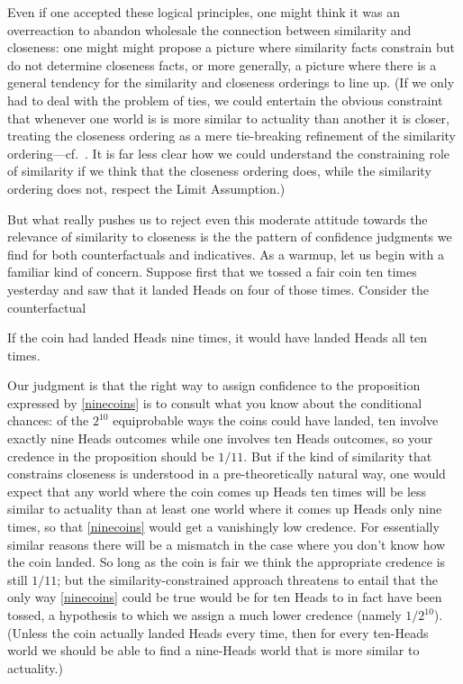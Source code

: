 \documentclass[If.tex]{subfiles}
\begin{document}
Even if one accepted these logical principles, one might think it was an overreaction to abandon wholesale the connection between similarity and closeness: one might might propose a picture where similarity facts constrain but do not determine closeness facts, or more generally, a picture where there is a general tendency for the similarity and closeness orderings to line up. (If we only had to deal with the problem of ties, we could entertain the obvious constraint that whenever one world is is more similar to actuality than another it is closer, treating the closeness ordering as a mere tie-breaking refinement of the similarity ordering---cf.~\cite{StalnakerDCEM}. It is far less clear how we could understand the constraining role of similarity if we think that the closeness ordering does, while the similarity ordering does not, respect the Limit Assumption.) 

But what really pushes us to reject even this moderate attitude towards the relevance of similarity to closeness is the the pattern of confidence judgments we find for both counterfactuals and indicatives. As a warmup, let us begin with a familiar kind of concern. Suppose first that we tossed a fair coin ten times yesterday and saw that it landed Heads on four of those times. Consider the counterfactual
\begin{prop}
\nitem \label{ninecoins}
  If the coin had landed Heads nine times, it would have landed Heads all ten times.
\end{prop}
Our judgment is that the right way to assign confidence to the proposition expressed by \ref{ninecoins} is to consult what you know about the conditional chances: of the $2^{10}$ equiprobable ways the coins could have landed, ten involve exactly nine Heads outcomes while one involves ten Heads outcomes, so your credence in the proposition should be $1/11$. But if the kind of similarity that constrains closeness is understood in a pre-theoretically natural way, one would expect that any world where the coin comes up Heads ten times will be less similar to actuality than at least one world where it comes up Heads only nine times, so that \ref{ninecoins} would get a vanishingly low credence. For essentially similar reasons there will be a mismatch in the case where you don't know how the coin landed. So long as the coin is fair we think the appropriate credence is still $1/11$; but the similarity-constrained approach threatens to entail that the only way \ref{ninecoins} could be true would be for ten Heads to in fact have been tossed, a hypothesis to which we assign a much lower credence (namely $1/2^{10}$). (Unless the coin actually landed Heads every time, then for every ten-Heads world we should be able to find a nine-Heads world that is more similar to actuality.)
\end{document}
